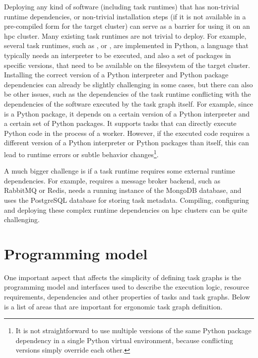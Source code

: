 Deploying any kind of software (including task runtimes) that has non-trivial runtime dependencies,
or non-trivial installation steps (if it is not available in a pre-compiled form for the target
cluster) can serve as a barrier for using it on an \gls{hpc} cluster. Many existing
task runtimes are not trivial to deploy. For example, several task runtimes, such as
\dask{}, \snakemake{} or \pycompss{}, are implemented in
Python, a language that typically needs an interpreter to be executed, and also a set of packages
in specific versions, that need to be available on the filesystem of the target cluster. Installing
the correct version of a Python interpreter and Python package dependencies can already be slightly
challenging in some cases, but there can also be other issues, such as the dependencies of the task
runtime conflicting with the dependencies of the software executed by the task graph itself. For
example, since \dask{} is a Python package, it depends on a certain version of a
Python interpreter and a certain set of Python packages. It supports tasks that can directly
execute Python code in the process of a \dask{} worker. However, if the executed
code requires a different version of a Python interpreter or Python packages than
\dask{} itself, this can lead to runtime errors or subtle behavior
changes\footnote{It is not straightforward to use multiple versions of the same Python package dependency in a
single Python virtual environment, because conflicting versions simply override each other.}.

A much bigger challenge is if a task runtime requires some external runtime dependencies. For
example, \merlin{} requires a message broker backend, such as RabbitMQ or Redis,
\fireworks{} needs a running instance of the MongoDB database, and
\balsam{} uses the PostgreSQL database for storing task metadata. Compiling,
configuring and deploying these complex runtime dependencies on \gls{hpc} clusters
can be quite challenging.

\section{Programming model}
One important aspect that affects the simplicity of defining task graphs is the programming model
and interfaces used to describe the execution logic, resource requirements, dependencies and other
properties of tasks and task graphs. Below is a list of areas that are important for ergonomic task
graph definition.

